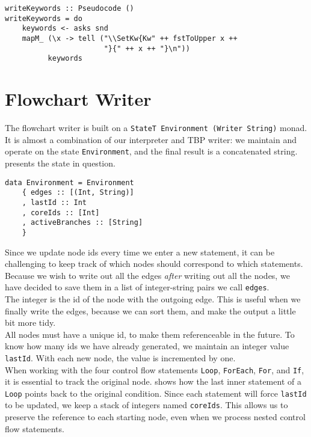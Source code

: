\begin{lstlisting}[caption={Adding LaTeX macros for keywords.}, captionpos=b, label={writeKW}]
writeKeywords :: Pseudocode ()
writeKeywords = do
    keywords <- asks snd
    mapM_ (\x -> tell ("\\SetKw{Kw" ++ fstToUpper x ++
                       "}{" ++ x ++ "}\n"))
          keywords
\end{lstlisting}


\section{Flowchart Writer}
\label{5_flowchartWriter}

The flowchart writer is built on a \texttt{StateT Environment (Writer String)} monad. It is almost a combination of our interpreter and TBP writer: we maintain and operate on the state \texttt{Environment}, and the final result is a concatenated string.  presents the state in question. \\

\begin{lstlisting}[caption={The IBP writer's state.}, captionpos=b, label={The IBP monad's environment type}]
data Environment = Environment
    { edges :: [(Int, String)]
    , lastId :: Int
    , coreIds :: [Int]
    , activeBranches :: [String]
    }    
\end{lstlisting}

Since we update node ids every time we enter a new statement, it can be challenging to keep track of which nodes should correspond to which statements. Because we wish to write out all the edges \textit{after} writing out all the nodes, we have decided to save them in a list of integer-string pairs we call \texttt{edges}. \\

The integer is the id of the node with the outgoing edge. This is useful when we finally write the edges, because we can sort them, and make the output a little bit more tidy. \\

All nodes must have a unique id, to make them referenceable in the future. To know how many ids we have already generated, we maintain an integer value \texttt{lastId}. With each new node, the value is incremented by one. \\

When working with the four control flow statements \texttt{Loop}, \texttt{ForEach}, \texttt{For}, and \texttt{If}, it is essential to track the original node.  shows how the last inner statement of a \texttt{Loop} points back to the original condition. Since each statement will force \texttt{lastId} to be updated, we keep a stack of integers named \texttt{coreIds}. This allows us to preserve the reference to each starting node, even when we process nested control flow statements. \\

